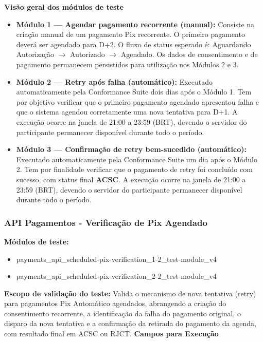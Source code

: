 \textbf{Visão geral dos módulos de teste}

\begin{itemize}
    \item \textbf{Módulo 1 — Agendar pagamento recorrente (manual):} Consiste na criação manual de um pagamento Pix recorrente. O primeiro pagamento deverá ser agendado para D+2. O fluxo de status esperado é: Aguardando Autorização $\rightarrow$ Autorizado $\rightarrow$ Agendado. Os dados de consentimento e de pagamento permanecem persistidos para utilização nos Módulos 2 e 3.
    
    \item \textbf{Módulo 2 — Retry após falha (automático):} Executado automaticamente pela Conformance Suite dois dias após o Módulo 1. Tem por objetivo verificar que o primeiro pagamento agendado apresentou falha e que o sistema agendou corretamente uma nova tentativa para D+1. A execução ocorre na janela de 21:00 a 23:59 (BRT), devendo o servidor do participante permanecer disponível durante todo o período.
    
    \item \textbf{Módulo 3 — Confirmação de retry bem-sucedido (automático):} Executado automaticamente pela Conformance Suite um dia após o Módulo 2. Tem por finalidade verificar que o pagamento de retry foi concluído com sucesso, com status final \textbf{ACSC}. A execução ocorre na janela de 21:00 a 23:59 (BRT), devendo o servidor do participante permanecer disponível durante todo o período.
\end{itemize}

\subsubsection{API Pagamentos - Verificação de Pix Agendado}

\textbf{Módulos de teste:}

\begin{itemize}
    \item payments\_api\_scheduled-pix-verification\_1-2\_test-module\_v4
    \item payments\_api\_scheduled-pix-verification\_2-2\_test-module\_v4
\end{itemize}
\medskip
\textbf{Escopo de validação do teste:}
\medskip
Valida o mecanismo de nova tentativa (retry) para pagamentos Pix Automático agendados, abrangendo a criação do consentimento recorrente, a identificação da falha do pagamento original, o disparo da nova tentativa e a confirmação da retirada do pagamento da agenda, com resultado final em ACSC ou RJCT.
\medskip
\textbf{Campos para Execução}

